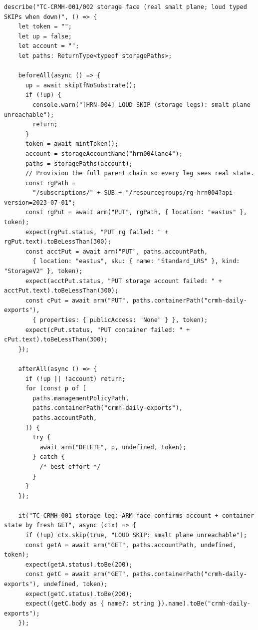 \documentclass[10pt,twoside,openany]{book}
\theoremstyle{plain}
\theoremstyle{definition}
\theoremstyle{remark}
\begin{document}
\begin{lstlisting}[caption={apps/web/test/harness/crmh/crmh.test.ts}]
  describe("TC-CRMH-001/002 storage face (real smalt plane; loud typed SKIPs when down)", () => {
    let token = "";
    let up = false;
    let account = "";
    let paths: ReturnType<typeof storagePaths>;

    beforeAll(async () => {
      up = await skipIfNoSubstrate();
      if (!up) {
        console.warn("[HRN-004] LOUD SKIP (storage legs): smalt plane unreachable");
        return;
      }
      token = await mintToken();
      account = storageAccountName("hrn004lane4");
      paths = storagePaths(account);
      // Provision the full parent chain so every leg sees real state.
      const rgPath =
        "/subscriptions/" + SUB + "/resourcegroups/rg-hrn004?api-version=2023-07-01";
      const rgPut = await arm("PUT", rgPath, { location: "eastus" }, token);
      expect(rgPut.status, "PUT rg failed: " + rgPut.text).toBeLessThan(300);
      const acctPut = await arm("PUT", paths.accountPath,
        { location: "eastus", sku: { name: "Standard_LRS" }, kind: "StorageV2" }, token);
      expect(acctPut.status, "PUT storage account failed: " + acctPut.text).toBeLessThan(300);
      const cPut = await arm("PUT", paths.containerPath("crmh-daily-exports"),
        { properties: { publicAccess: "None" } }, token);
      expect(cPut.status, "PUT container failed: " + cPut.text).toBeLessThan(300);
    });

    afterAll(async () => {
      if (!up || !account) return;
      for (const p of [
        paths.managementPolicyPath,
        paths.containerPath("crmh-daily-exports"),
        paths.accountPath,
      ]) {
        try {
          await arm("DELETE", p, undefined, token);
        } catch {
          /* best-effort */
        }
      }
    });

    it("TC-CRMH-001 storage leg: ARM face confirms account + container state by fresh GET", async (ctx) => {
      if (!up) ctx.skip(true, "LOUD SKIP: smalt plane unreachable");
      const getA = await arm("GET", paths.accountPath, undefined, token);
      expect(getA.status).toBe(200);
      const getC = await arm("GET", paths.containerPath("crmh-daily-exports"), undefined, token);
      expect(getC.status).toBe(200);
      expect((getC.body as { name?: string }).name).toBe("crmh-daily-exports");
    });


\end{lstlisting}
\end{document}
